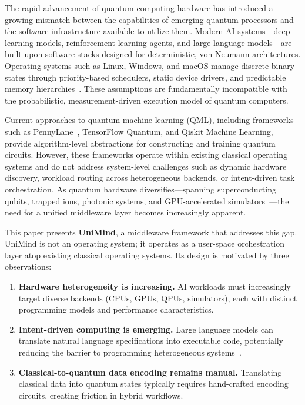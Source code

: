 ﻿\documentclass[12pt,a4paper]{article}
\begin{document}
The rapid advancement of quantum computing hardware has introduced a growing mismatch between the capabilities of emerging quantum processors and the software infrastructure available to utilize them. Modern AI systems---deep learning models, reinforcement learning agents, and large language models---are built upon software stacks designed for deterministic, von Neumann architectures. Operating systems such as Linux, Windows, and macOS manage discrete binary states through priority-based schedulers, static device drivers, and predictable memory hierarchies~\cite{tanenbaum2023}. These assumptions are fundamentally incompatible with the probabilistic, measurement-driven execution model of quantum computers.

Current approaches to quantum machine learning (QML), including frameworks such as PennyLane~\cite{bergholm2018}, TensorFlow Quantum, and Qiskit Machine Learning, provide algorithm-level abstractions for constructing and training quantum circuits. However, these frameworks operate within existing classical operating systems and do not address system-level challenges such as dynamic hardware discovery, workload routing across heterogeneous backends, or intent-driven task orchestration. As quantum hardware diversifies---spanning superconducting qubits, trapped ions, photonic systems, and GPU-accelerated simulators~\cite{microsoft2024,aws2024}---the need for a unified middleware layer becomes increasingly apparent.

This paper presents \textbf{UniMind}, a middleware framework that addresses this gap. UniMind is not an operating system; it operates as a user-space orchestration layer atop existing classical operating systems. Its design is motivated by three observations:

\begin{enumerate}[leftmargin=2em]
    \item \textbf{Hardware heterogeneity is increasing.} AI workloads must increasingly target diverse backends (CPUs, GPUs, QPUs, simulators), each with distinct programming models and performance characteristics.
    \item \textbf{Intent-driven computing is emerging.} Large language models can translate natural language specifications into executable code, potentially reducing the barrier to programming heterogeneous systems~\cite{wang2024}.
    \item \textbf{Classical-to-quantum data encoding remains manual.} Translating classical data into quantum states typically requires hand-crafted encoding circuits, creating friction in hybrid workflows.
\end{enumerate}
\end{document}
